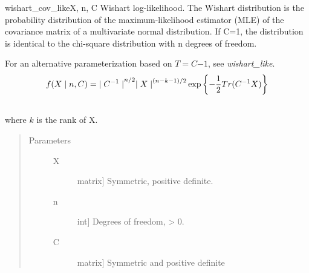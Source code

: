 \hypertarget{pymc.distributions.wishart_cov_like}{}\begin{funcdesc}{wishart\_cov\_like}{X, n, C}
Wishart log-likelihood. The Wishart distribution is the probability
distribution of the maximum-likelihood estimator (MLE) of the covariance
matrix of a multivariate normal distribution. If C=1, the distribution
is identical to the chi-square distribution with n degrees of freedom.

For an alternative parameterization based on $T=C{-1}$, see
\emph{wishart\_like}.
\begin{gather}
\begin{split}f(X \mid n, C) = {\mid C^{-1} \mid}^{n/2}{\mid X \mid}^{(n-k-1)/2} \exp\left\{ -\frac{1}{2} Tr(C^{-1}X) \right\}\end{split}\notag\\\begin{split}\end{split}\notag
\end{gather}
where $k$ is the rank of X.
\begin{quote}\begin{description}
\item[Parameters] \leavevmode\begin{description}
\item[X] \leavevmode{[}matrix{]}
Symmetric, positive definite.

\item[n] \leavevmode{[}int{]}
Degrees of freedom, \textgreater{} 0.

\item[C] \leavevmode{[}matrix{]}
Symmetric and positive definite

\end{description}

\end{description}\end{quote}
\end{funcdesc}

